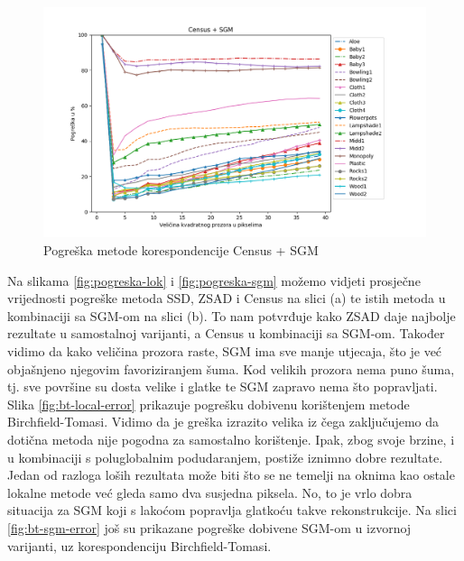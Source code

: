 \documentclass[utf8, zavrsni, numeric]{fer}
\begin{document}
\begin{figure}[H]
  \centering
  \includegraphics[width=13cm]{img/Census_sgm_middlebury.png}
  \caption{Pogreška metode korespondencije Census + SGM}
  \label{fig:Census-sgm-error}
\end{figure}

Na slikama \ref{fig:pogreska-lok} i \ref{fig:pogreska-sgm} možemo vidjeti prosječne vrijednosti pogreške metoda SSD, ZSAD i Census na
slici (a) te istih metoda u kombinaciji sa SGM-om na slici (b). To nam potvrđuje kako ZSAD
daje najbolje rezultate u samostalnoj varijanti, a Census u kombinaciji sa SGM-om.
Također vidimo da kako veličina prozora raste, SGM ima sve manje utjecaja, što je već objašnjeno
njegovim favoriziranjem šuma. Kod velikih prozora nema puno šuma, tj. sve površine su dosta velike i glatke te SGM zapravo nema što popravljati. Slika \ref{fig:bt-local-error} prikazuje pogrešku dobivenu korištenjem metode Birchfield-Tomasi.
Vidimo da je greška izrazito velika iz čega zaključujemo da dotična metoda nije pogodna za samostalno korištenje. Ipak, zbog svoje brzine, i u kombinaciji s poluglobalnim podudaranjem, postiže iznimno dobre rezultate. Jedan od razloga loših rezultata može biti što se ne temelji na oknima kao ostale lokalne metode već gleda samo dva susjedna piksela. No, to je vrlo dobra situacija za SGM koji s lakoćom popravlja glatkoću takve rekonstrukcije. Na slici \ref{fig:bt-sgm-error} još su
prikazane pogreške dobivene SGM-om u izvornoj varijanti, uz korespondenciju Birchfield-Tomasi.
\end{document}

